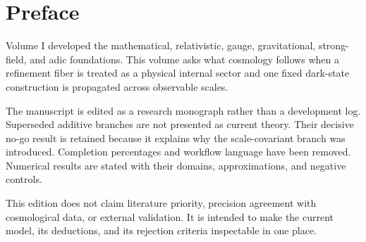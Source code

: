 \chapter*{Preface}
Volume I developed the mathematical, relativistic, gauge, gravitational, strong-field, and adic foundations. This volume asks what cosmology follows when a refinement fiber is treated as a physical internal sector and one fixed dark-state construction is propagated across observable scales.

The manuscript is edited as a research monograph rather than a development log. Superseded additive branches are not presented as current theory. Their decisive no-go result is retained because it explains why the scale-covariant branch was introduced. Completion percentages and workflow language have been removed. Numerical results are stated with their domains, approximations, and negative controls.

This edition does not claim literature priority, precision agreement with cosmological data, or external validation. It is intended to make the current model, its deductions, and its rejection criteria inspectable in one place.
